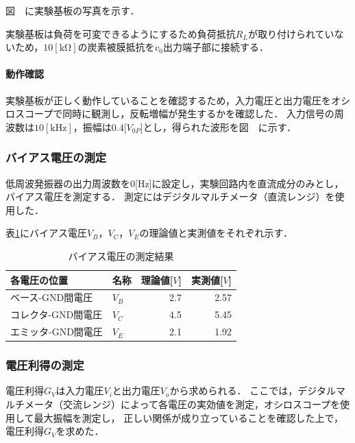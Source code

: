 \documentclass[dvipdfmx,titlepage,a4j]{jsarticle}  %
\numberwithin{equation}{section}
\begin{document}
図　に実験基板の写真を示す．

実験基板は負荷を可変できるようにするため負荷抵抗$R_L$が取り付けられていないため，$10 \mathrm{[k\Omega]}$の炭素被膜抵抗を$v_0$出力端子部に接続する．

\paragraph{動作確認}
実験基板が正しく動作していることを確認するため，入力電圧と出力電圧をオシロスコープで同時に観測し，反転増幅が発生するかを確認した．
入力信号の周波数は$10 \mathrm{[kHz]}$，振幅は$0.4$[$V_{0P}$]とし，得られた波形を図　に示す．

\subsubsection{バイアス電圧の測定}
低周波発振器の出力周波数を0[Hz]に設定し，実験回路内を直流成分のみとし，バイアス電圧を測定する．
測定にはデジタルマルチメータ（直流レンジ）を使用した．

表\ref{tbl:res;bias}にバイアス電圧$V_B$，$V_C$，$V_E$の理論値と実測値をそれぞれ示す．
\begin{table}[H]
  \caption{バイアス電圧の測定結果}
  \begin{center}
    \begin{tabular}{l|l|r|r}
      \hline
      各電圧の位置       & 名称  & \multicolumn{1}{l|}{理論値[$V$]} & \multicolumn{1}{l}{実測値[$V$]} \\ \hline\hline
      ベース-GND間電圧   & $V_B$ & 2.7                              & 2.57                            \\ \hline
      コレクタ-GND間電圧 & $V_C$ & 4.5                              & 5.45                            \\ \hline
      エミッタ-GND間電圧 & $V_E$ & 2.1                              & 1.92                            \\ \hline
    \end{tabular}
  \end{center}
  \label{tbl:res;bias}
\end{table}

\subsubsection{電圧利得の測定}
電圧利得$G_V$は入力電圧$V_i$と出力電圧$V_o$から求められる．
ここでは，デジタルマルチメータ（交流レンジ）によって各電圧の実効値を測定，オシロスコープを使用して最大振幅を測定し，
正しい関係が成り立っていることを確認した上で，電圧利得$G_V$を求めた．
\end{document}
